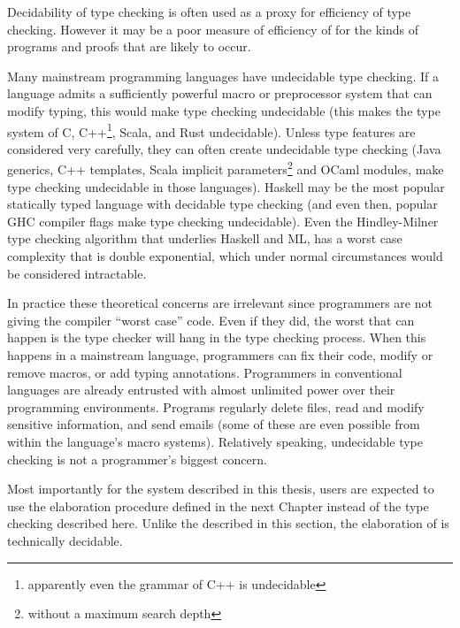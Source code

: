 Decidability of type checking is often used as a proxy for efficiency of type checking.
However it may be a poor measure of efficiency of for the kinds of programs and proofs that are likely to occur.
 
 
Many mainstream programming languages have undecidable type checking.
If a language admits a sufficiently powerful macro or preprocessor system that can modify typing, this would make type checking undecidable (this makes the type system of C, C++\footnote{apparently even the grammar of C++ is undecidable}, Scala, and Rust undecidable).
Unless type features are considered very carefully, they can often create undecidable type checking (Java generics, C++ templates, Scala implicit parameters\footnote{without a maximum search depth} and OCaml modules, make type checking undecidable in those languages).
Haskell may be the most popular statically typed language with decidable type checking (and even then, popular GHC compiler flags make type checking undecidable).
Even the Hindley-Milner type checking algorithm that underlies Haskell and ML, has a worst case complexity that is double exponential, which under normal circumstances would be considered intractable.
 
In practice these theoretical concerns are irrelevant since programmers are not giving the compiler ``worst case'' code.
Even if they did, the worst that can happen is the type checker will hang in the type checking process.
When this happens in a mainstream language, programmers can fix their code, modify or remove macros, or add typing annotations.
Programmers in conventional languages are already entrusted with almost unlimited power over their programming environments.
Programs regularly delete files, read and modify sensitive information, and send emails (some of these are even possible from within the language's macro systems).
Relatively speaking, undecidable type checking is not a programmer's biggest concern.
 
Most importantly for the system described in this thesis, users are expected to use the elaboration procedure defined in the next Chapter instead of the \bidir{} type checking described here.
Unlike the \bidir{} described in this section, the elaboration of  is technically decidable.

